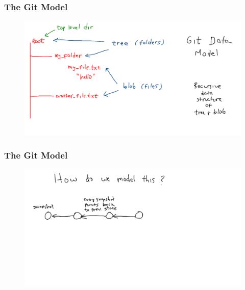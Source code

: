 \documentclass[11pt]{beamer}
\begin{document}
\begin{frame}[fragile]
\frametitle{The Git Model}

\begin{figure}[htp]
 \centering
 \includegraphics[scale=0.2]{git_model1.png}
\end{figure}

\end{frame}




\begin{frame}[fragile]
\frametitle{The Git Model}

\begin{figure}[htp]
 \centering
 \includegraphics[scale=0.2]{git_model2a.png}
\end{figure}

\end{frame}


\end{document}
